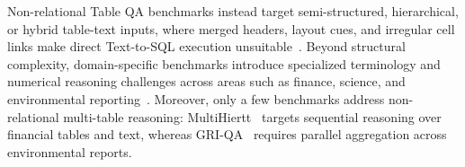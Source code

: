 Non-relational Table QA benchmarks instead target semi-structured, hierarchical, or hybrid table-text inputs, where merged headers, layout cues, and irregular cell links make direct Text-to-SQL execution unsuitable~\cite{1.13,1.2,1.3,1.11,1.10,1.28,1.8,1.7}. 
Beyond structural complexity, domain-specific benchmarks introduce specialized terminology and numerical reasoning challenges across areas such as finance, science, and environmental reporting~\cite{1.9,1.22,1.23,1.24,1.25,1.15,1.18,1.27,1.29}. Moreover, only a few benchmarks address non-relational multi-table reasoning: MultiHiertt~\cite{1.26} targets sequential reasoning over financial tables and text, whereas GRI-QA~\cite{1.16} requires parallel aggregation across environmental reports.


